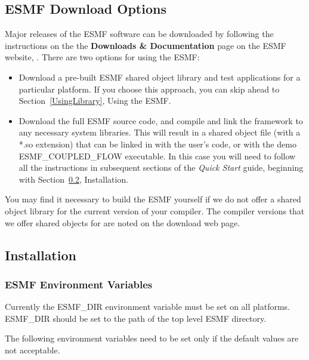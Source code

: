 
\subsection{ESMF Download Options}

Major releases of the ESMF software can be downloaded by following
the instructions on the 
the {\bf Downloads \& Documentation} page on the ESMF 
website, .  There are two options for using the ESMF:

\begin{itemize}
\item Download a pre-built ESMF shared object library and
test applications for a particular platform.  If you choose
this approach, you can skip ahead to Section~\ref{UsingLibrary},
Using the ESMF.  
\item Download the full ESMF source code, and compile and link
the framework to any necessary system libraries.  This will
result in a shared object file (with a *.so extension)
that can be linked in with the user's code, or with the demo
{ESMF\_COUPLED\_FLOW} executable.  In this case you will need
to follow all the instructions in subsequent sections of the 
{\it Quick Start} guide, beginning with Section~\ref{InstallProcedures},
Installation.
\end{itemize}

You may find it necessary to build the ESMF yourself
if we do not offer a shared object library for the current
version of your compiler.  The compiler versions that we offer
shared objects for are noted on the download web page.

\subsection{Installation}
\label{InstallProcedures}



\subsubsection{ESMF Environment Variables}

Currently the ESMF\_DIR environment variable must be set on all
platforms.  ESMF\_DIR should be set to the path of the top
level ESMF directory.  

The following environment variables need to be set only if the
default values are not acceptable.

